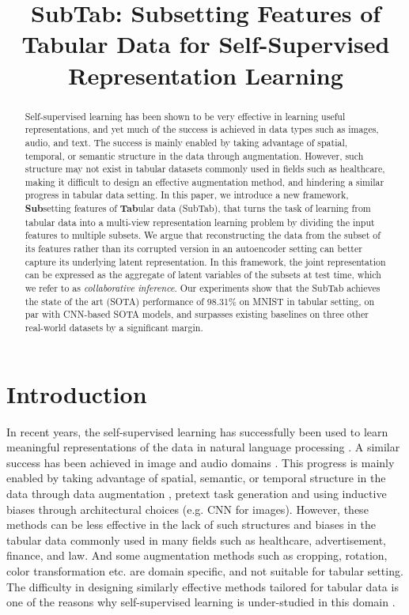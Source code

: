 \title{SubTab: Subsetting Features of Tabular Data for Self-Supervised Representation Learning}

\begin{abstract}
Self-supervised learning has been shown to be very effective in learning useful representations, and yet much of the success is achieved in data types such as images, audio, and text. The success is mainly enabled by taking advantage of spatial, temporal, or semantic structure in the data through augmentation. However, such structure may not exist in tabular datasets commonly used in fields such as healthcare, making it difficult to design an effective augmentation method, and hindering a similar progress in tabular data setting. In this paper, we introduce a new framework, {\bf Sub}setting features of {\bf Tab}ular data (SubTab), that turns the task of learning from tabular data into a multi-view representation learning problem by dividing the input features to multiple subsets. We argue that reconstructing the data from the subset of its features rather than its corrupted version in an autoencoder setting can better capture its underlying latent representation. In this framework, the joint representation can be expressed as the aggregate of latent variables of the subsets at test time, which we refer to as \emph{collaborative inference}. Our experiments show that the SubTab achieves the state of the art (SOTA) performance of 98.31\% on MNIST in tabular setting, on par with CNN-based SOTA models, and surpasses existing baselines on three other real-world datasets by a significant margin.
\end{abstract}

\section{Introduction}
In recent years, the self-supervised learning has successfully been used to learn meaningful representations of the data in natural language processing \citep{mikolov2013efficient, pennington2014glove, devlin2018bert, liu2019roberta, conneau2019unsupervised, joulin2016bag, collobert2008unified}. A similar success has been achieved in image and audio domains \citep{chen2020simple, grill2020bootstrap, oord2018representation, caron2020unsupervised, he2020momentum, falcon2020framework, chen2020improved}. This progress is mainly enabled by taking advantage of spatial, semantic, or temporal structure in the data through data augmentation \citep{chen2020simple}, pretext task generation \citep{devlin2018bert} and using inductive biases through architectural choices (e.g. CNN for images). However, these methods can be less effective in the lack of such structures and biases in the tabular data commonly used in many fields such as healthcare, advertisement, finance, and law. And some augmentation methods such as cropping, rotation, color transformation etc. are domain specific, and not suitable for tabular setting. The difficulty in designing similarly effective methods tailored for tabular data is one of the reasons why self-supervised learning is under-studied in this domain \citep{yoon2020vime}.


